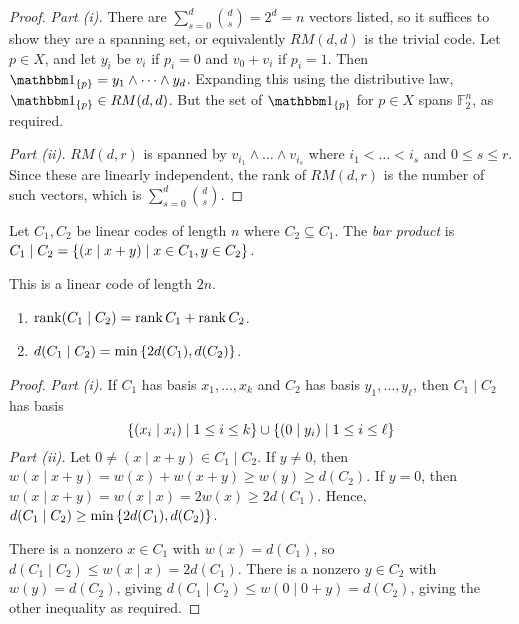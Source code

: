 \begin{proof}
    \emph{Part (i).}
    There are \( \sum_{s=0}^d \binom{d}{s} = 2^d = n \) vectors listed, so it suffices to show they are a spanning set, or equivalently \( RM(d,d) \) is the trivial code.
    Let \( p \in X \), and let \( y_i \) be \( v_i \) if \( p_i = 0 \) and \( v_0 + v_i \) if \( p_i = 1 \).
    Then \( \mathbbm 1_{\qty{p}} = y_1 \wedge \dots \wedge y_d \).
    Expanding this using the distributive law, \( \mathbbm 1_{\qty{p}} \in RM(d,d) \).
    But the set of \( \mathbbm 1_{\qty{p}} \) for \( p \in X \) spans \( \mathbb F_2^n \), as required.

    \emph{Part (ii).}
    \( RM(d,r) \) is spanned by \( v_{i_1} \wedge \dots \wedge v_{i_s} \) where \( i_1 < \dots < i_s \) and \( 0 \leq s \leq r \).
    Since these are linearly independent, the rank of \( RM(d,r) \) is the number of such vectors, which is \( \sum_{s=0}^d \binom{d}{s} \).
\end{proof}
\begin{definition}
    Let \( C_1, C_2 \) be linear codes of length \( n \) where \( C_2 \subseteq C_1 \).
    The \emph{bar product} is \( C_1 \mid C_2 = \qty{(x \mid x + y) \mid x \in C_1, y \in C_2} \).
\end{definition}
This is a linear code of length \( 2n \).
\begin{lemma}
    \begin{enumerate}
        \item \( \rank (C_1 \mid C_2) = \rank C_1 + \rank C_2 \).
        \item \( d(C_1 \mid C_2) = \min \qty{2d(C_1), d(C_2)} \).
    \end{enumerate}
\end{lemma}
\begin{proof}
    \emph{Part (i).}
    If \( C_1 \) has basis \( x_1, \dots, x_k \) and \( C_2 \) has basis \( y_1, \dots, y_\ell \), then \( C_1 \mid C_2 \) has basis
    \[ \qty{(x_i \mid x_i) \mid 1 \leq i \leq k} \cup \qty{(0 \mid y_i) \mid 1 \leq i \leq \ell} \]
    \emph{Part (ii).}
    Let \( 0 \neq (x \mid x + y) \in C_1 \mid C_2 \).
    If \( y \neq 0 \), then \( w(x \mid x + y) = w(x) + w(x + y) \geq w(y) \geq d(C_2) \).
    If \( y = 0 \), then \( w(x \mid x + y) = w(x \mid x) = 2w(x) \geq 2d(C_1) \).
    Hence, \( d(C_1 \mid C_2) \geq \min\qty{2d(C_1), d(C_2)} \).
    
    There is a nonzero \( x \in C_1 \) with \( w(x) = d(C_1) \), so \( d(C_1 \mid C_2) \leq w(x \mid x) = 2d(C_1) \).
    There is a nonzero \( y \in C_2 \) with \( w(y) = d(C_2) \), giving \( d(C_1 \mid C_2) \leq w(0 \mid 0 + y) = d(C_2) \), giving the other inequality as required.
\end{proof}
